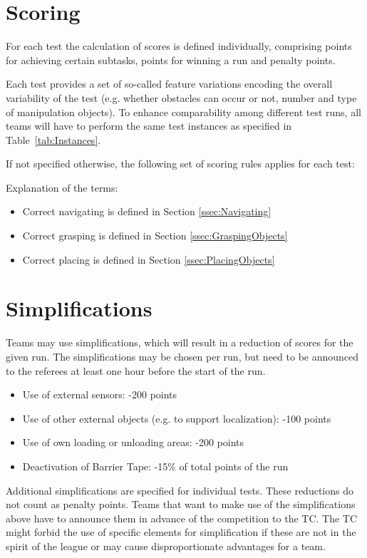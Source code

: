 \section{Scoring} \label{sec:ScoringAndRanking}

For each test the calculation of scores is defined individually, comprising points for achieving certain subtasks,
points for winning a run and penalty points.
\par
Each test provides a set of so-called feature variations encoding the overall variability of the test (e.g. whether
obstacles can occur or not, number and type of manipulation objects). To enhance comparability among different test
runs, all teams will have to perform the same test instances as specified in Table~\ref{tab:Instances}.
\par
If not specified otherwise, the following set of scoring rules applies for each test:


Explanation of the terms:
\begin{itemize}
\item Correct navigating is defined in Section \ref{ssec:Navigating}
\item Correct grasping is defined in Section \ref{ssec:GraspingObjects}
\item Correct placing is defined in Section \ref{ssec:PlacingObjects}
\end{itemize}

\section{Simplifications}
Teams may use simplifications, which will result in a reduction of scores for the given run. The simplifications may be
chosen per run, but need to be announced to the referees at least one hour before the start of the run.

\begin{itemize}
	\item Use of external sensors: \hfill -200 points
	\item Use of other external objects (e.g. to support localization): \hfill -100 points
	\item Use of own loading or unloading areas: \hfill -200 points
  \item Deactivation of Barrier Tape: -15\% of total points of the run
\end{itemize}

Additional simplifications are specified for individual tests. These reductions do not count as penalty points. Teams
that want to make use of the simplifications above have to announce them in advance of the competition to the TC. The
TC might forbid the use of specific elements for simplification if these are not in the spirit of the league or may
cause disproportionate advantages for a team.

